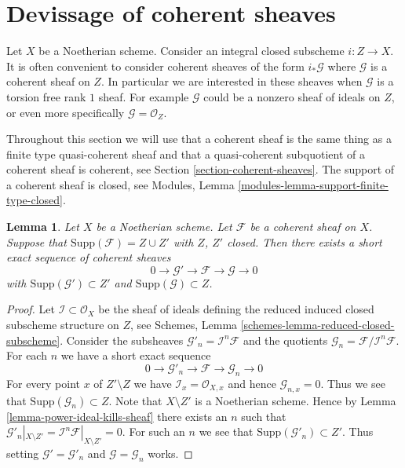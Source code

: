 \documentclass{stacks-project}
\theoremstyle{plain}
\newtheorem{lemma}[subsection]{Lemma}
\theoremstyle{definition}
\theoremstyle{remark}
\numberwithin{equation}{subsection}
\begin{document}
\section{Devissage of coherent sheaves}
\label{section-devissage}

\noindent
Let $X$ be a Noetherian scheme. Consider an integral closed subscheme
$i : Z \to X$. It is often convenient to consider coherent sheaves of
the form $i_*\mathcal{G}$ where $\mathcal{G}$ is a coherent sheaf on
$Z$. In particular we are interested in these sheaves when $\mathcal{G}$
is a torsion free rank $1$ sheaf. For example $\mathcal{G}$ could be
a nonzero sheaf of ideals on $Z$, or even more specifically
$\mathcal{G} = \mathcal{O}_Z$.

\medskip\noindent
Throughout this section we will use that a coherent sheaf is the
same thing as a finite type quasi-coherent sheaf and that a
quasi-coherent subquotient of a coherent sheaf is coherent, see
Section \ref{section-coherent-sheaves}.
The support of a coherent sheaf is closed, see
Modules, Lemma \ref{modules-lemma-support-finite-type-closed}.

\begin{lemma}
\label{lemma-prepare-filter-support}
Let $X$ be a Noetherian scheme.
Let $\mathcal{F}$ be a coherent sheaf on $X$.
Suppose that $\text{Supp}(\mathcal{F}) = Z \cup Z'$ with $Z$, $Z'$ closed.
Then there exists a short exact sequence of coherent sheaves
$$
0 \to \mathcal{G}' \to \mathcal{F} \to \mathcal{G} \to 0
$$
with $\text{Supp}(\mathcal{G}') \subset Z'$ and
$\text{Supp}(\mathcal{G}) \subset Z$.
\end{lemma}

\begin{proof}
Let $\mathcal{I} \subset \mathcal{O}_X$ be the sheaf of ideals
defining the reduced induced closed subscheme structure on $Z$, see
Schemes, Lemma \ref{schemes-lemma-reduced-closed-subscheme}.
Consider the subsheaves
$\mathcal{G}'_n = \mathcal{I}^n\mathcal{F}$ and the
quotients $\mathcal{G}_n = \mathcal{F}/\mathcal{I}^n\mathcal{F}$.
For each $n$ we have a short exact sequence
$$
0 \to \mathcal{G}'_n \to \mathcal{F} \to \mathcal{G}_n \to 0
$$
For every point $x$ of $Z' \setminus Z$ we have
$\mathcal{I}_x = \mathcal{O}_{X, x}$
and hence $\mathcal{G}_{n, x} = 0$. Thus we see that
$\text{Supp}(\mathcal{G}_n) \subset Z$. Note that $X \setminus Z'$
is a Noetherian scheme. Hence by Lemma \ref{lemma-power-ideal-kills-sheaf}
there exists an $n$ such that
$\mathcal{G}'_n|_{X \setminus Z'} =
\mathcal{I}^n\mathcal{F}|_{X \setminus Z'} = 0$.
For such an $n$ we see that $\text{Supp}(\mathcal{G}'_n) \subset Z'$.
Thus setting
$\mathcal{G}' = \mathcal{G}'_n$ and $\mathcal{G} = \mathcal{G}_n$
works.
\end{proof}
\end{document}
